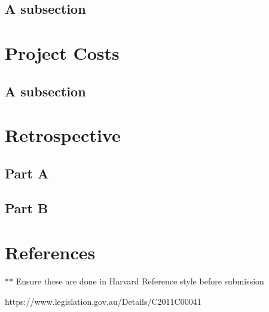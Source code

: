 \documentclass[11pt]{article} %
\begin{document}
\subsection{A subsection}

\section{Project Costs}
\subsection{A subsection}

\section{Retrospective}
\subsection{Part A}
\subsection{Part B}

\newpage
\section{References}

** Ensure these are done in Harvard Reference style before submission

https://www.legislation.gov.au/Details/C2011C00041
\end{document}
